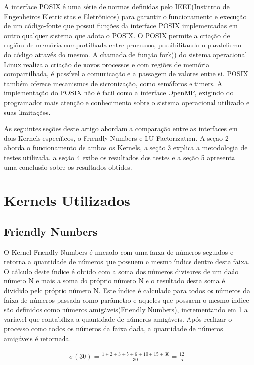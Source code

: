 \documentclass[12pt]{article}
\begin{document}
A interface POSIX é uma série de normas definidas pelo IEEE(Instituto de Engenheiros Eletricistas e Eletrônicos) para garantir o funcionamento e execução de um código-fonte que possui funções da interface POSIX implementadas em outro qualquer sistema que adota o POSIX. O POSIX permite a criação de regiões de memória compartilhada entre processos, possibilitando o paralelismo do código através do mesmo. A chamada de função fork() do sistema operacional Linux realiza a criação de novos processos e com regiões de memória compartilhada, é possível a comunicação e a passagem de valores entre si. POSIX também oferece mecanismos de sicronização, como semáforos e timers. A implementação do POSIX não é fácil como a interface OpenMP, exigindo do programador mais atenção e conhecimento sobre o sistema operacional utilizado e suas limitações.

As seguintes seções deste artigo abordam a comparação entre as interfaces em dois Kernels específicos, o Friendly Numbers e LU Factorization. A seção 2 aborda o funcionamento de ambos os Kernels, a seção 3 explica a metodologia de testes utilizada, a seção 4 exibe os resultados dos testes e a seção 5 apresenta uma conclusão sobre os resultados obtidos. 



\section{Kernels Utilizados}
\subsection{Friendly Numbers}

O Kernel Friendly Numbers é iniciado com uma faixa de números seguidos e retorna a quantidade de números que possuem o mesmo índice dentro desta faixa. O cálculo deste índice é obtido com a soma dos números divisores de um dado número N e mais a soma do próprio número N e o resultado desta soma é dividido pelo próprio número N. Este índice é calculado para todos os números da faixa de números passada como parâmetro e aqueles que possuem o mesmo índice são definidos como números amigáveis(Friendly Numbers), incrementando em 1 a varíavel que contabiliza a quantidade de números amigáveis. Após realizar o processo como todos os números da faixa dada, a quantidade de números amigáveis é retornada. 

\begin{gather*}
{\sigma \left ( 30 \right )} =  \frac{1+2+3+5+6+10+15+30}{30} = \frac{12}{5}
\end{gather*}
\end{document}
